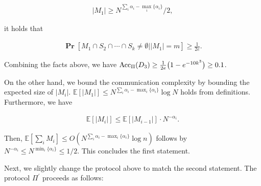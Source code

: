 \[\begin{gathered}
|M_{1}|\geq N^{\sum_{i}\alpha_{i}-\mathop{\max}_{i}\{\alpha_{i}\}}/2,
\end{gathered}\]


it holds that\par


\[\begin{gathered}
\operatorname*{\mathbf{Pr}}[M_{1}\cap S_{2}\cap\cdots\cap S_{k}\neq\emptyset||M_{1}|=m]\geq\frac{1}{2e}.
\end{gathered}\]


Combining the facts above, we have $\text{Acc}_{\Pi}(D_{3})\geq\frac{1}{2e}\big{(}1-e^{-10k^{3}}\big{)}\geq 0.1$.\par




On the other hand, we bound the communication complexity by bounding the expected size of $|M_{i}|$. $\mathbb{E}[|M_{1}|]\leq N^{\sum_{i}\alpha_{i}-\mathop{\max}_{i}\{\alpha_{i}\}}\log
N$ holds from definitions. Furthermore, we have\par


\[\begin{gathered}
\mathbb{E}[|M_{i}|]\leq\mathbb{E}[|M_{i-1}|]\cdot N^{-\alpha_{i}}.
\end{gathered}\]


Then, $\mathbb{E}[\sum_{i}M_{i}]\leq O(N^{\sum_{i}\alpha_{i}-\mathop{\max}_{i}\{\alpha_{i}\}}\log n)$ follows by $N^{-\alpha_{i}}\leq N^{\min_{i}\{\alpha_{i}\}}\leq 1/2$. This concludes the first statement.\par




Next, we slightly change the protocol above to match the second statement. The protocol $\Pi^{\prime}$ proceeds as follows:\par


